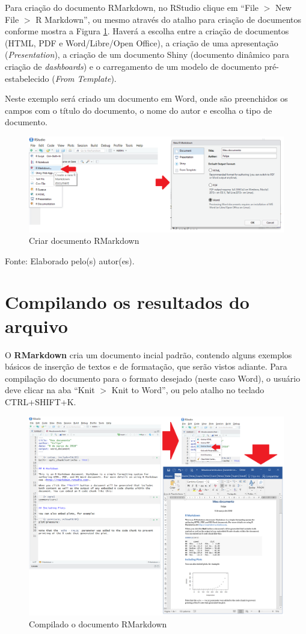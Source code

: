 \documentclass[12pt,brazil,]{book}
\begin{document}
Para criação do documento RMarkdown, no RStudio clique em ``File \(>\)
New File \(>\) R Markdown'', ou mesmo através do atalho para criação de
documentos conforme mostra a Figura \ref{fig:criararq1}. Haverá a
escolha entre a criação de documentos (HTML, PDF e Word/Libre/Open
Office), a criação de uma apresentação (\emph{Presentation}), a criação
de um documento Shiny (documento dinâmico para criação de
\emph{dashboards}) e o carregamento de um modelo de documento
pré-estabelecido (\emph{From Template}).

Neste exemplo será criado um documento em Word, onde são preenchidos os
campos com o título do documento, o nome do autor e escolha o tipo de
documento.

\begin{figure}

{\centering \includegraphics[width=0.6\linewidth]{criararq1} 

}

\caption{Criar documento RMarkdown}\label{fig:criararq1}
\end{figure}

Fonte: Elaborado pelo(s) autor(es).

\hypertarget{compilando-os-resultados-do-arquivo}{%
\section{Compilando os resultados do
arquivo}\label{compilando-os-resultados-do-arquivo}}

O \textbf{RMarkdown} cria um documento incial padrão, contendo alguns
exemplos básicos de inserção de textos e de formatação, que serão vistos
adiante. Para compilação do documento para o formato desejado (neste
caso Word), o usuário deve clicar na aba ``Knit \(>\) Knit to Word'', ou
pelo atalho no teclado CTRL+SHIFT+K.

\begin{figure}

{\centering \includegraphics[width=0.6\linewidth]{compilar} 

}

\caption{Compilado o documento RMarkdown}\label{fig:compil}
\end{figure}
\end{document}
